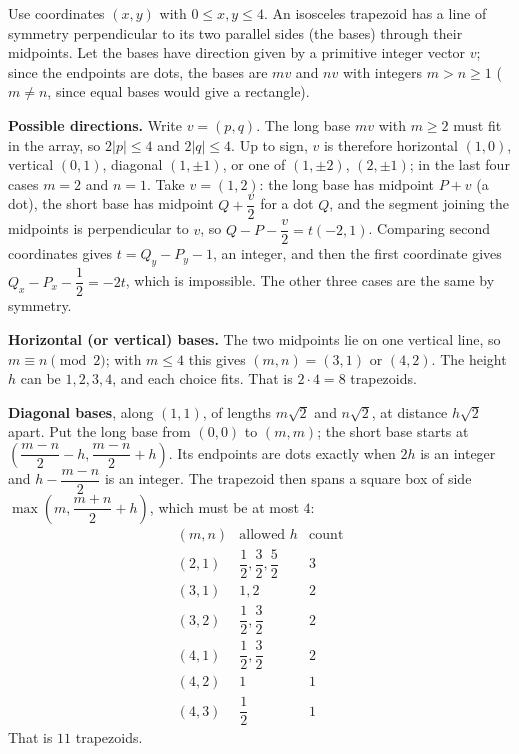 Use coordinates $(x,y)$ with $0\le x,y\le4$. An isosceles trapezoid has a line of symmetry perpendicular to its two parallel sides (the bases) through their midpoints. Let the bases have direction given by a primitive integer vector $v$; since the endpoints are dots, the bases are $m v$ and $n v$ with integers $m>n\ge1$ ($m\ne n$, since equal bases would give a rectangle).

\textbf{Possible directions.} Write $v=(p,q)$. The long base $mv$ with $m\ge2$ must fit in the array, so $2|p|\le4$ and $2|q|\le4$. Up to sign, $v$ is therefore horizontal $(1,0)$, vertical $(0,1)$, diagonal $(1,\pm1)$, or one of $(1,\pm2)$, $(2,\pm1)$; in the last four cases $m=2$ and $n=1$. Take $v=(1,2)$: the long base has midpoint $P+v$ (a dot), the short base has midpoint $Q+\dfrac{v}{2}$ for a dot $Q$, and the segment joining the midpoints is perpendicular to $v$, so $Q-P-\dfrac{v}{2}=t(-2,1)$. Comparing second coordinates gives $t=Q_y-P_y-1$, an integer, and then the first coordinate gives $Q_x-P_x-\dfrac{1}{2}=-2t$, which is impossible. The other three cases are the same by symmetry.

\textbf{Horizontal (or vertical) bases.} The two midpoints lie on one vertical line, so $m\equiv n\pmod 2$; with $m\le4$ this gives $(m,n)=(3,1)$ or $(4,2)$. The height $h$ can be $1,2,3,4$, and each choice fits. That is $2\cdot4=8$ trapezoids.

\textbf{Diagonal bases}, along $(1,1)$, of lengths $m\sqrt2$ and $n\sqrt2$, at distance $h\sqrt2$ apart. Put the long base from $(0,0)$ to $(m,m)$; the short base starts at $\left(\dfrac{m-n}{2}-h,\dfrac{m-n}{2}+h\right)$. Its endpoints are dots exactly when $2h$ is an integer and $h-\dfrac{m-n}{2}$ is an integer. The trapezoid then spans a square box of side $\max\left(m,\dfrac{m+n}{2}+h\right)$, which must be at most $4$:
\[
\begin{array}{c|c|c}
(m,n)&\text{allowed }h&\text{count}\\\hline
(2,1)&\dfrac{1}{2},\dfrac{3}{2},\dfrac{5}{2}&3\\
(3,1)&1,2&2\\
(3,2)&\dfrac{1}{2},\dfrac{3}{2}&2\\
(4,1)&\dfrac{1}{2},\dfrac{3}{2}&2\\
(4,2)&1&1\\
(4,3)&\dfrac{1}{2}&1
\end{array}
\]
That is $11$ trapezoids.

